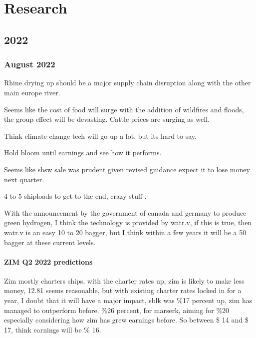 \chapter{Research}


\section{2022}

\subsection{August 2022}

Rhine drying up should be a major supply chain disruption along with the other main europe river.

Seems like the cost of food will surge with the addition of wildfires and floods, the group effect will be devasting. Cattle prices are surging as well.

Think climate change tech will go up a lot, but its hard to say.

Hold bloom until earnings and see how it performs.

Seems like sbsw sale was prudent given revised guidance expect it to lose money next quarter.


4 to 5 shiploads to get to the end, crazy stuff \cite{youtube_2022}.

With the announcement by the government of canada and germany to produce green hydrogen, I think the technology is provided by watr.v, if this is true, then watr.v is an easy 10 to 20 bagger, but I think within a few years it will be a 50 bagger at these current levels.

\subsubsection{ZIM Q2 2022 predictions}

Zim mostly charters ships, with the charter rates up, zim is likely to make less money, 12.81 seems reasonable, but with existing charter rates locked in for a year, I doubt that it will have a major impact, sblk was \%17 percent up, zim has managed to outperform before. \%26 percent, for marserk, aiming for \%20 especially considering how zim has grew earnings before. So between \$ 14 and \$ 17, think earnings will be \% 16. 

